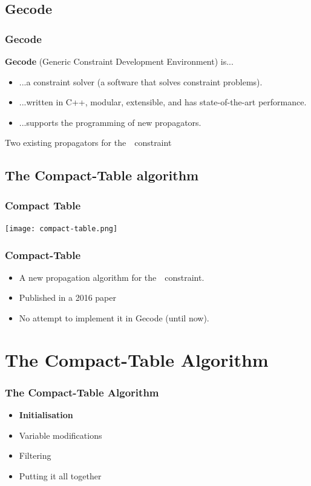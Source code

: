 \documentclass{beamer}
\newcommand{\Table}{\Constraint{Table}}
\newcommand{\CTpaper}[0]{DBLP:conf/cp/DemeulenaereHLP16}
\begin{document}
\subsection{Gecode}

\begin{frame}
  \frametitle{Gecode}
  \textbf{Gecode} (Generic Constraint Development Environment)
  is...

  \begin{itemize}
    \item ...a constraint solver (a software that solves constraint problems).
    \item ...written in C++, modular, extensible, and has state-of-the-art performance.
    \item ...supports the programming of new propagators.
  \end{itemize}

  Two existing propagators for the~\Table~constraint

\end{frame}

\subsection{The Compact-Table algorithm}

\begin{frame}
  \frametitle{Compact Table}
  \texttt{[image: compact-table.png]}
\end{frame}

\begin{frame}
  \frametitle{Compact-Table}
  \begin{itemize}
  \item   A new propagation algorithm for the~\Table~constraint.
  \item   Published in a 2016 paper%
  \item   No attempt to implement it in Gecode (until now).
  \end{itemize}

\end{frame}

\section{The Compact-Table Algorithm}

\begin{frame}
  \frametitle{The Compact-Table Algorithm}
  \begin{itemize}
  \item \textbf{Initialisation}
  \item \color{gray}Variable modifications
  \item Filtering
   \item {\color{gray}Putting it all together}
  \end{itemize}

\end{frame}
\end{document}
